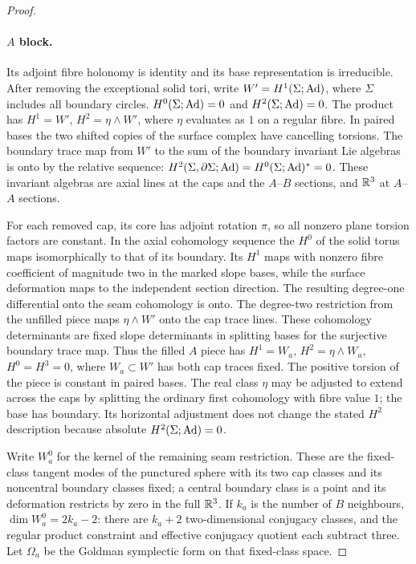 \begin{proof}
\paragraph{\(A\) block.}
Its adjoint fibre holonomy is identity and its base representation is irreducible. After removing the exceptional solid tori, write \(W'=H^1(\Sigma;\operatorname{Ad})\), where \(\Sigma\) includes all boundary circles. \(H^0(\Sigma;\operatorname{Ad})=0\) and \(H^2(\Sigma;\operatorname{Ad})=0\). The product has \(H^1=W'\), \(H^2=\eta\wedge W'\), where \(\eta\) evaluates as \(1\) on a regular fibre. In paired bases the two shifted copies of the surface complex have cancelling torsions. The boundary trace map from \(W'\) to the sum of the boundary invariant Lie algebras is onto by the relative sequence: \(H^2(\Sigma,\partial\Sigma;\operatorname{Ad})=H^0(\Sigma;\operatorname{Ad})^*=0\). These invariant algebras are axial lines at the caps and the \(A\)--\(B\) sections, and \(\mathbb R^3\) at \(A\)--\(A\) sections.

For each removed cap, its core has adjoint rotation \(\pi\), so all nonzero plane torsion factors are constant. In the axial cohomology sequence the \(H^0\) of the solid torus maps isomorphically to that of its boundary. Its \(H^1\) maps with nonzero fibre coefficient of magnitude two in the marked slope bases, while the surface deformation maps to the independent section direction. The resulting degree-one differential onto the seam cohomology is onto. The degree-two restriction from the unfilled piece maps \(\eta\wedge W'\) onto the cap trace lines. These cohomology determinants are fixed slope determinants in splitting bases for the surjective boundary trace map. Thus the filled \(A\) piece has \(H^1=W_a\), \(H^2=\eta\wedge W_a\), \(H^0=H^3=0\), where \(W_a\subset W'\) has both cap traces fixed. The positive torsion of the piece is constant in paired bases. The real class \(\eta\) may be adjusted to extend across the caps by splitting the ordinary first cohomology with fibre value \(1\); the base has boundary. Its horizontal adjustment does not change the stated \(H^2\) description because absolute \(H^2(\Sigma;\operatorname{Ad})=0\).

Write \(W_a^0\) for the kernel of the remaining seam restriction. These are the fixed-class tangent modes of the punctured sphere with its two cap classes and its noncentral boundary classes fixed; a central boundary class is a point and its deformation restricts by zero in the full \(\mathbb R^3\). If \(k_a\) is the number of \(B\) neighbours, \(\dim W_a^0=2k_a-2\): there are \(k_a+2\) two-dimensional conjugacy classes, and the regular product constraint and effective conjugacy quotient each subtract three. Let \(\Omega_a\) be the Goldman symplectic form on that fixed-class space.


\end{proof}
